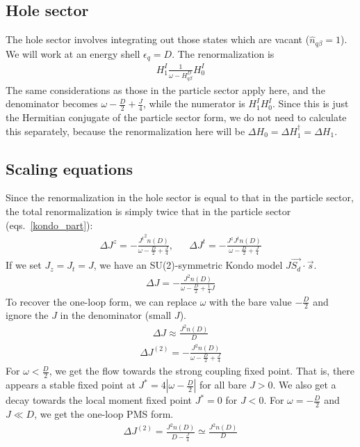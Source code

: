 \documentclass[12pt]{revtex4-2}
\begin{document}
\subsection{Hole sector}
The hole sector involves integrating out those states which are vacant (\(\hat n_{q\beta}=1\)). We will work at an energy  shell \(\epsilon_q = D\). The renormalization is
\begin{align}
	H^I_1 \frac{1}{\omega - H^D_{q\beta}} H^I_0
\end{align}
The same considerations as those in the particle sector apply here, and the denominator becomes \(\omega - \frac{D}{2} + \frac{J}{4}\), while the numerator is \(H^I_1 H^I_0\). Since this is just the Hermitian conjugate of the particle sector form, we do not need to calculate this separately, because the renormalization here will be \(\Delta H_0 = \Delta H_1^\dagger = \Delta H_1\).

\subsection{Scaling equations}
Since the renormalization in the hole sector is equal to that in the particle sector, the total renormalization is simply twice that in the particle sector (eqs.~\ref{kondo_part}):
\begin{align}
	\Delta J^z = -\frac{{J^t}^2n(D)}{\omega - \frac{D}{2} + \frac{J}{4}}, && \Delta J^t = -\frac{J^z J^tn(D)}{\omega - \frac{D}{2} + \frac{J}{4}}
\end{align}
If we set \(J_z = J_t = J\), we have an SU(2)-symmetric Kondo model \(J \vec{S_d}\cdot\vec{s}\).
\begin{align}
	\label{kondosym}
	\Delta J = - \frac{J^2 n(D)}{\omega - \frac{D}{2} + \frac{1}{4}J}
\end{align}
To recover the one-loop form, we can replace \(\omega\) with the bare value \(-\frac{D}{2}\) and ignore the \(J\) in the denominator (small \(J\)).
\begin{align}
	\Delta J \approx \frac{J^2 n(D)}{D}
\end{align}
\begin{align}
	\Delta J^{(2)} = -\frac{J^2 n(D)}{\omega - \frac{D}{2} + \frac{J}{4}}
\end{align}
For \(\omega < \frac{D}{2}\), we get the flow towards the strong coupling fixed point. That is, there appears a stable fixed point at \(J^* = 4|\omega - \frac{D}{2}|\) for all bare \(J > 0\). We also get a decay towards the local moment fixed point \(J^* = 0\) for \(J < 0\). For \(\omega = -\frac{D}{2}\) and \(J \ll D\), we get the one-loop PMS form. 
\begin{align}
	\Delta J^{(2)} = \frac{J^2 n(D)}{D - \frac{J}{4}} \simeq \frac{J^2 n(D)}{D}
\end{align}
\end{document}
